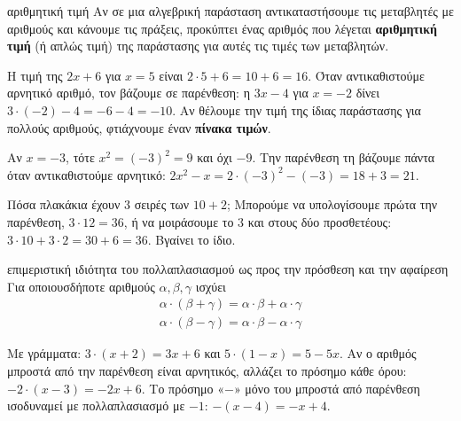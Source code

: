 
\begin{orismos}{αριθμητική τιμή}
Αν σε μια αλγεβρική παράσταση αντικαταστήσουμε τις μεταβλητές με αριθμούς και κάνουμε τις πράξεις, προκύπτει ένας αριθμός που λέγεται \textbf{αριθμητική τιμή} (ή απλώς τιμή) της παράστασης για αυτές τις τιμές των μεταβλητών.
\end{orismos}

Η τιμή της $2x+6$ για $x=5$ είναι $2\cdot5+6=10+6=16$. Όταν αντικαθιστούμε αρνητικό αριθμό, τον βάζουμε σε παρένθεση: η $3x-4$ για $x=-2$ δίνει $3\cdot(-2)-4=-6-4=-10$. Αν θέλουμε την τιμή της ίδιας παράστασης για πολλούς αριθμούς, φτιάχνουμε έναν \textbf{πίνακα τιμών}.

\begin{prosoxi}
Αν $x=-3$, τότε $x^2=(-3)^2=9$ και όχι $-9$. Την παρένθεση τη βάζουμε πάντα όταν αντικαθιστούμε αρνητικό: $2x^2-x=2\cdot(-3)^2-(-3)=18+3=21$.
\end{prosoxi}


Πόσα πλακάκια έχουν $3$ σειρές των $10+2$; Μπορούμε να υπολογίσουμε πρώτα την παρένθεση, $3\cdot12=36$, ή να μοιράσουμε το $3$ και στους δύο προσθετέους: $3\cdot10+3\cdot2=30+6=36$. Βγαίνει το ίδιο.

\begin{idiotita}{επιμεριστική ιδιότητα του πολλαπλασιασμού ως προς την πρόσθεση και την αφαίρεση}
Για οποιουσδήποτε αριθμούς $\alpha,\beta,\gamma$ ισχύει
\begin{gather*}\alpha\cdot(\beta+\gamma)=\alpha\cdot\beta+\alpha\cdot\gamma\\[4pt]\alpha\cdot(\beta-\gamma)=\alpha\cdot\beta-\alpha\cdot\gamma\end{gather*}
\end{idiotita}

Με γράμματα: $3\cdot(x+2)=3x+6$ και $5\cdot(1-x)=5-5x$. Αν ο αριθμός μπροστά από την παρένθεση είναι αρνητικός, αλλάζει το πρόσημο κάθε όρου: $-2\cdot(x-3)=-2x+6$. Το πρόσημο «$-$» μόνο του μπροστά από παρένθεση ισοδυναμεί με πολλαπλασιασμό με $-1$: $-(x-4)=-x+4$.



